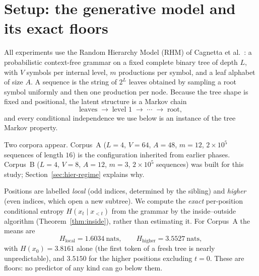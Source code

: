 %
%      

\section{Setup: the generative model and its exact floors}
\label{sec:hier-setup}

All experiments use the Random Hierarchy Model (RHM) of
Cagnetta et al.~\cite{cagnetta2024}: a probabilistic context-free grammar on a
fixed complete binary tree of depth $L$, with $V$ symbols per internal level,
$m$ productions per symbol, and a leaf alphabet of size $A$. A sequence is the
string of $2^L$ leaves obtained by sampling a root symbol uniformly and then
one production per node. Because the tree shape is fixed and positional, the
latent structure is a Markov chain
\begin{equation}
  \text{leaves} \;\to\; \text{level }1 \;\to\; \cdots \;\to\; \text{root},
  \label{eq:markov}
\end{equation}
and every conditional independence we use below is an instance of the tree
Markov property.

Two corpora appear. Corpus~A ($L=4$, $V=64$, $A=48$, $m=12$, $2\times10^5$
sequences of length $16$) is the configuration inherited from earlier phases.
Corpus~B ($L=4$, $V=8$, $A=12$, $m=3$, $2\times10^5$ sequences) was built for
this study; Section~\ref{sec:hier-regime} explains why.

Positions are labelled \emph{local} (odd indices, determined by the sibling)
and \emph{higher} (even indices, which open a new subtree). We compute the
\emph{exact} per-position conditional entropy $H(x_t \mid x_{<t})$ from the
grammar by the inside--outside algorithm (Theorem~\ref{thm:inside}), rather
than estimating it. For Corpus~A the means are
\begin{equation}
  H_{\mathrm{local}} = 1.6034 \ \text{nats}, \qquad
  H_{\mathrm{higher}} = 3.5527 \ \text{nats},
  \label{eq:floorsA}
\end{equation}
with $H(x_0)=3.8161$ alone (the first token of a fresh tree is nearly
unpredictable), and $3.5150$ for the higher positions excluding $t=0$. These
are floors: no predictor of any kind can go below them.

